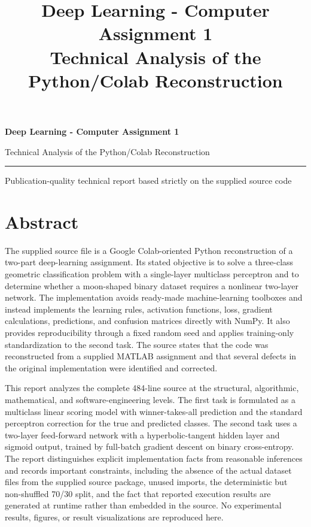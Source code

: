 \documentclass[11pt,a4paper]{article}
\title{\textbf{Deep Learning - Computer Assignment 1}\\[0.35em]\large Technical Analysis of the Python/Colab Reconstruction}
\author{}
\date{}
\begin{document}
\hypersetup{pageanchor=false}
\begin{titlepage}
\centering
\vspace*{30mm}
{\LARGE\bfseries Deep Learning - Computer Assignment 1\par}
\vspace{7mm}
{\Large Technical Analysis of the Python/Colab Reconstruction\par}
\vspace{16mm}
\rule{0.75\textwidth}{0.6pt}\par
\vspace{7mm}
{\large Publication-quality technical report based strictly on the supplied source code\par}
\vfill
\end{titlepage}

\hypersetup{pageanchor=true}
\tableofcontents
\clearpage
{}

\section*{Abstract}
The supplied source file is a Google Colab-oriented Python reconstruction of a two-part deep-learning assignment. Its stated objective is to solve a three-class geometric classification problem with a single-layer multiclass perceptron and to determine whether a moon-shaped binary dataset requires a nonlinear two-layer network. The implementation avoids ready-made machine-learning toolboxes and instead implements the learning rules, activation functions, loss, gradient calculations, predictions, and confusion matrices directly with NumPy. It also provides reproducibility through a fixed random seed and applies training-only standardization to the second task. The source states that the code was reconstructed from a supplied MATLAB assignment and that several defects in the original implementation were identified and corrected.

This report analyzes the complete 484-line source at the structural, algorithmic, mathematical, and software-engineering levels. The first task is formulated as a multiclass linear scoring model with winner-takes-all prediction and the standard perceptron correction for the true and predicted classes. The second task uses a two-layer feed-forward network with a hyperbolic-tangent hidden layer and sigmoid output, trained by full-batch gradient descent on binary cross-entropy. The report distinguishes explicit implementation facts from reasonable inferences and records important constraints, including the absence of the actual dataset files from the supplied source package, unused imports, the deterministic but non-shuffled 70/30 split, and the fact that reported execution results are generated at runtime rather than embedded in the source. No experimental results, figures, or result visualizations are reproduced here.
\end{document}

